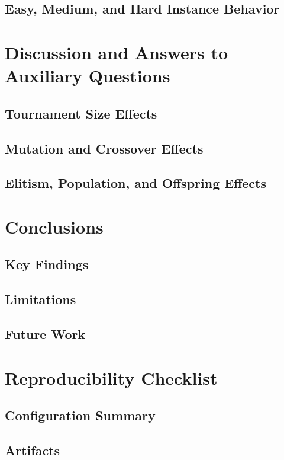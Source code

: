 \documentclass[12pt,a4paper]{report}
\begin{document}
\section{Easy, Medium, and Hard Instance Behavior}

\chapter{Discussion and Answers to Auxiliary Questions}
\section{Tournament Size Effects}

\section{Mutation and Crossover Effects}

\section{Elitism, Population, and Offspring Effects}

\chapter{Conclusions}
\section{Key Findings}

\section{Limitations}

\section{Future Work}

\appendix
\chapter{Reproducibility Checklist}
\section{Configuration Summary}

\section{Artifacts}
\end{document}
